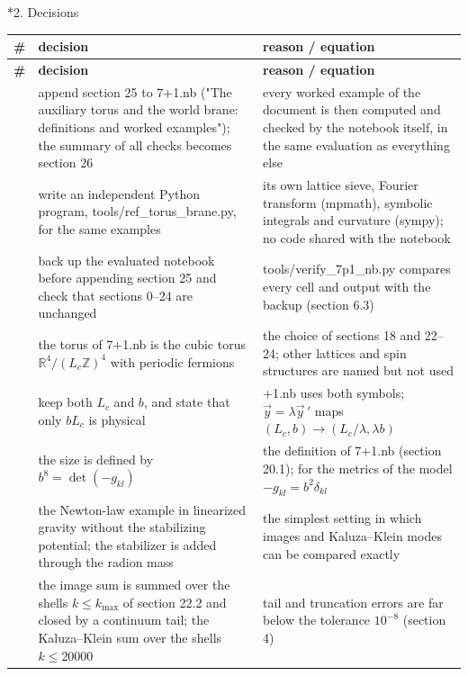 \documentclass[10pt,a4paper]{article}
\makeatletter
\renewcommand\section{\@startsection{section}{1}{\z@}{-3.5ex \@plus -1ex \@minus -.2ex}{2.3ex \@plus.2ex}{\normalfont\Large\bfseries\raggedright}}
\makeatother
\begin{document}
\section*{2. Decisions}
{\footnotesize
\begin{longtable}{>{\raggedright\arraybackslash}p{}>{\raggedright\arraybackslash}p{}>{\raggedright\arraybackslash}p{}}
\toprule
\textbf{\#} & \textbf{decision} & \textbf{reason / equation} \\
\midrule\endfirsthead
\toprule
\textbf{\#} & \textbf{decision} & \textbf{reason / equation} \\
\midrule\endhead
\endfoot
\bottomrule\endlastfoot
1 & append section 25 to 7+1.nb ("The auxiliary torus and the world brane: definitions and worked examples"); the summary of all checks becomes section 26 & every worked example of the document is then computed and checked by the notebook itself, in the same evaluation as everything else \\
2 & write an independent Python program, tools/ref\_torus\_brane.py, for the same examples & its own lattice sieve, Fourier transform (mpmath), symbolic integrals and curvature (sympy); no code shared with the notebook \\
3 & back up the evaluated notebook before appending section 25 and check that sections 0–24 are unchanged & tools/verify\_7p1\_nb.py compares every cell and output with the backup (section 6.3) \\
4 & the torus of 7+1.nb is the cubic torus $\mathbb R^4/(L_c\mathbb Z)^4$ with periodic fermions & the choice of sections 18 and 22–24; other lattices and spin structures are named but not used \\
5 & keep both $L_c$ and $b$, and state that only $bL_c$ is physical & 7+1.nb uses both symbols; $\vec y=\lambda\vec y\,'$ maps $(L_c,b)\to(L_c/\lambda,\lambda b)$ \\
6 & the size is defined by $b^8=\det(-g_{kl})$ & the definition of 7+1.nb (section 20.1); for the metrics of the model $-g_{kl}=b^2\delta_{kl}$ \\
7 & the Newton-law example in linearized gravity without the stabilizing potential; the stabilizer is added through the radion mass & the simplest setting in which images and Kaluza–Klein modes can be compared exactly \\
8 & the image sum is summed over the shells $k\le k_{\max}$ of section 22.2 and closed by a continuum tail; the Kaluza–Klein sum over the shells $k\le20000$ & tail and truncation errors are far below the tolerance $10^{-8}$ (section 4) \\

\end{longtable}}
\end{document}
